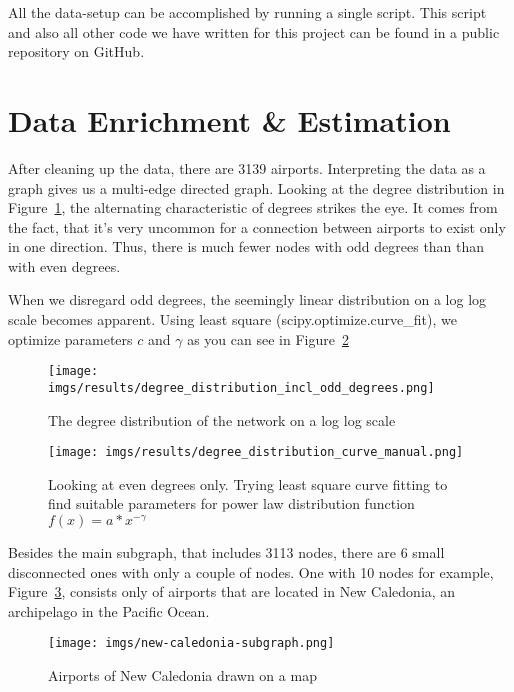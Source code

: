 \documentclass[twocolumn]{tum-article}
\begin{document}
All the data-setup can be accomplished by running a single script.
This script and also all other code we have written for this project can be found in a public repository on GitHub\cite{repository}.

\section{Data Enrichment \& Estimation}
After cleaning up the data, there are 3139 airports. 
Interpreting the data as a graph gives us a multi-edge directed graph.
Looking at the degree distribution in Figure~\ref{fig:degree_distribution}, the alternating characteristic of degrees strikes the eye. It comes from the fact, that it's very uncommon for a connection between airports to exist only in one direction. Thus, there is much fewer nodes with odd degrees than than with even degrees. 

When we disregard odd degrees, the seemingly linear distribution on a log log scale becomes apparent. Using least square (scipy.optimize.curve\_fit), we optimize parameters $c$ and $\gamma$ as you can see in Figure~\ref{fig:degree_distribution_curves}

\begin{figure}
	\centering
	\texttt{[image: imgs/results/degree\_distribution\_incl\_odd\_degrees.png]}
	\caption{
The degree distribution of the network on a log log scale }
	\label{fig:degree_distribution}
\end{figure}

\begin{figure}
	\centering
	\texttt{[image: imgs/results/degree\_distribution\_curve\_manual.png]}
	\caption{
Looking at even degrees only. Trying least square curve fitting to find suitable parameters for power law distribution function $f(x) = a * x^{-\gamma}$}
	\label{fig:degree_distribution_curves}
\end{figure}

Besides the main subgraph, that includes 3113 nodes, there are 6 small disconnected ones with only a couple of nodes.
One with 10 nodes for example, Figure~\ref{fig:new_caledonia}, consists only of airports that are located in New Caledonia, an archipelago in the Pacific Ocean. 
\begin{figure}
	\centering
	\texttt{[image: imgs/new-caledonia-subgraph.png]}
	\caption{Airports of New Caledonia drawn on a map}
	\label{fig:new_caledonia}
\end{figure}
\end{document}
